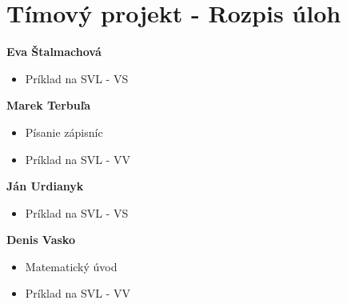 

    \section{Tímový projekt - Rozpis úloh}
    \textbf{Eva Štalmachová}
    \begin{itemize}
        \item Príklad na SVL - VS
    \end{itemize}
    \textbf{Marek Terbuľa}
    \begin{itemize}
        \item Písanie zápisníc
        \item Príklad na SVL - VV
    \end{itemize}
    \textbf{Ján Urdianyk}
    \begin{itemize}
        \item Príklad na SVL - VS
    \end{itemize}
    \textbf{Denis Vasko}
    \begin{itemize}
        \item Matematický úvod
        \item Príklad na SVL - VV
    \end{itemize}

